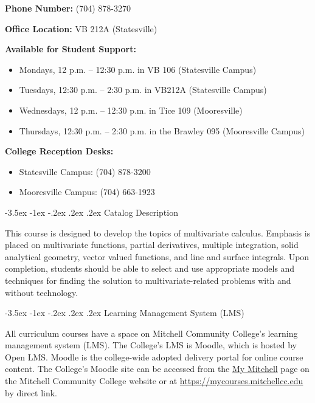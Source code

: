 \documentclass{article}
\makeatletter
\renewcommand\section{\@startsection{section}{1}{0pt}%
  {-3.5ex \@plus -1ex \@minus -.2ex}%
  {.2ex \@plus.2ex}%
  {\normalfont\Large\bfseries}} %
\makeatother
\begin{document}
\textbf{Phone Number:} (704) 878-3270

\textbf{Office Location:} VB 212A (Statesville)

\textbf{Available for Student Support:}

\begin{itemize}
\item Mondays, 12 p.m. -- 12:30 p.m. in VB 106 (Statesville Campus)
\item Tuesdays, 12:30 p.m. -- 2:30 p.m. in VB212A (Statesville Campus)
\item Wednesdays, 12 p.m. -- 12:30 p.m. in Tice 109 (Mooresville)
\item Thursdays, 12:30 p.m. -- 2:30 p.m. in the Brawley 095 (Mooresville Campus)
\end{itemize}

\textbf{College Reception Desks:}

\begin{itemize}
\item Statesville Campus: (704) 878-3200
\item Mooresville Campus: (704) 663-1923
\end{itemize}

\section{Catalog Description}

This course is designed to develop the topics of multivariate calculus. Emphasis is placed on multivariate functions, partial derivatives, multiple integration, solid analytical geometry, vector valued functions, and line and surface integrals. Upon completion, students should be able to select and use appropriate models and techniques for finding the solution to multivariate-related problems with and without technology.

\section{Learning Management System (LMS)}

All curriculum courses have a space on Mitchell Community College's learning management system (LMS). The College's LMS is Moodle, which is hosted by Open LMS. Moodle is the college-wide adopted delivery portal for online course content. The College's Moodle site can be accessed from the \href{https://mitchellcc.edu/my-mitchell}{My Mitchell} page on the Mitchell Community College website or at \href{https://mycourses.mitchellcc.edu}{https://mycourses.mitchellcc.edu} by direct link.
\end{document}
